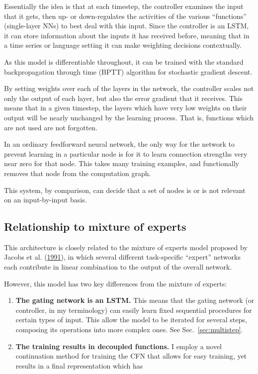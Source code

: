 \documentclass[12pt,twoside]{mitthesis}
\providecommand{\tightlist}{%
  \setlength{\itemsep}{0pt}\setlength{\parskip}{0pt}}
\begin{document}
Essentially the idea is that at each timestep, the controller examines
the input that it gets, then up- or down-regulates the activities of the
various ``functions'' (single-layer NNs) to best deal with this input.
Since the controller is an LSTM, it can store information about the
inputs it has received before, meaning that in a time series or language
setting it can make weighting decisions contextually.

As this model is differentiable throughout, it can be trained with the
standard backpropagation through time (BPTT) algorithm for stochastic
gradient descent.

By setting weights over each of the layers in the network, the
controller scales not only the output of each layer, but also the error
gradient that it receives. This means that in a given timestep, the
layers which have very low weights on their output will be nearly
unchanged by the learning process. That is, functions which are not used
are not forgotten.

In an ordinary feedforward neural network, the only way for the network
to prevent learning in a particular node is for it to learn connection
strengths very near zero for that node. This takes many training
examples, and functionally removes that node from the computation graph.

This system, by comparison, can decide that a set of nodes is or is not
relevant on an input-by-input basis.

\subsection{Relationship to mixture of
experts}\label{relationship-to-mixture-of-experts}

This architecture is closely related to the mixture of experts model
proposed by Jacobs et al.
(\protect\hyperlink{ref-jacobs1991task}{1991}), in which several
different task-specific ``expert'' networks each contribute in linear
combination to the output of the overall network.

However, this model has two key differences from the mixture of experts:

\begin{enumerate}
\def\labelenumi{\arabic{enumi}.}
\tightlist
\item
  \textbf{The gating network is an LSTM.} This means that the gating
  network (or controller, in my terminology) can easily learn fixed
  sequential procedures for certain types of input. This allow the model
  to be iterated for several steps, composing its operations into more
  complex ones. See Sec.~\ref{sec:multistep}.
\item
  \textbf{The training results in decoupled functions.} I employ a novel
  continuation method for training the CFN that allows for easy
  training, yet results in a final representation which has
\end{enumerate}
\end{document}
